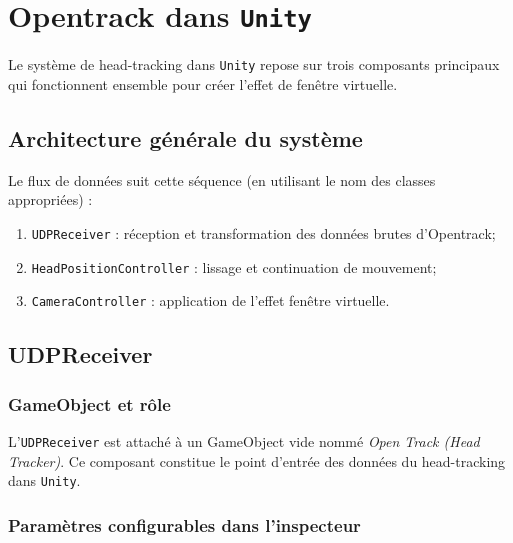 \documentclass[12pt]{report}
\begin{document}
\section{Opentrack dans \texttt{Unity}}

Le système de head-tracking dans \texttt{Unity} repose sur trois composants principaux qui fonctionnent ensemble pour créer l'effet de fenêtre virtuelle.

\subsection{Architecture générale du système}

Le flux de données suit cette séquence (en utilisant le nom des classes appropriées) :
\begin{enumerate}
    \item \texttt{UDPReceiver} : réception et transformation des données brutes d'Opentrack;
    \item \texttt{HeadPositionController} : lissage et continuation de mouvement;
    \item \texttt{CameraController} : application de l'effet fenêtre virtuelle.
\end{enumerate}

\subsection{UDPReceiver}

\subsubsection{GameObject et rôle}
L'\texttt{UDPReceiver} est attaché à un GameObject vide nommé \textit{Open Track (Head Tracker)}. Ce composant constitue le point d'entrée des données du head-tracking dans \texttt{Unity}.

\subsubsection{Paramètres configurables dans l'inspecteur}
\end{document}

